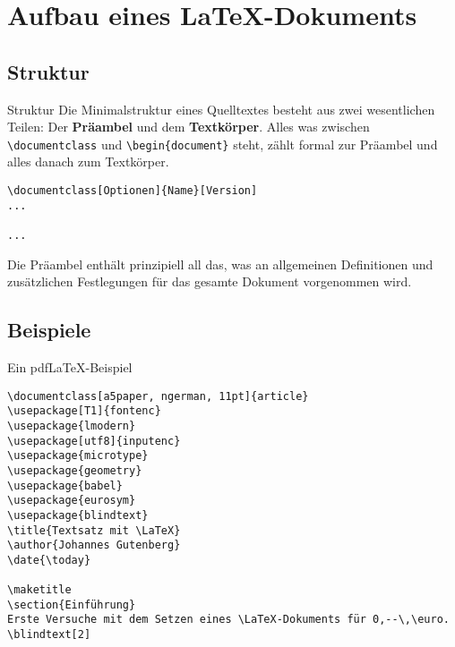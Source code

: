 \section{Aufbau eines \LaTeX{}-Dokuments}

\subsection{Struktur}

\begin{frame}[fragile]{Struktur}
	Die Minimalstruktur eines Quelltextes besteht aus zwei wesentlichen Teilen: Der \textbf{Präambel} und dem \textbf{Textkörper}. Alles was zwischen \texttt{\textbackslash documentclass} und \texttt{\textbackslash begin\{document\}} steht, zählt formal zur Präambel und alles danach zum Textkörper. 	
\begin{lstlisting}[style=tex]
\documentclass[Optionen]{Name}[Version] 
...

...

\end{lstlisting}
Die Präambel enthält prinzipiell all das, was an allgemeinen Definitionen und zusätzlichen Festlegungen für das gesamte Dokument vorgenommen wird.	
\end{frame}

\subsection{Beispiele}

\begin{frame}[fragile]{Ein pdf\LaTeX{}-Beispiel}
\begin{lstlisting}[style=tex]
%% Ein pdflatex-Beispiel
\documentclass[a5paper, ngerman, 11pt]{article}
\usepackage[T1]{fontenc}
\usepackage{lmodern}
\usepackage[utf8]{inputenc}
\usepackage{microtype}
\usepackage{geometry}
\usepackage{babel}
\usepackage{eurosym}
\usepackage{blindtext}
\title{Textsatz mit \LaTeX}
\author{Johannes Gutenberg}
\date{\today}

\maketitle
\section{Einführung}
Erste Versuche mit dem Setzen eines \LaTeX-Dokuments für 0,--\,\euro.
\blindtext[2]

\end{lstlisting}
\end{frame}

